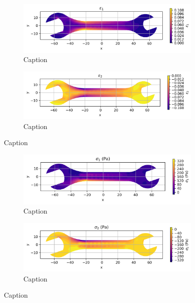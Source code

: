\documentclass{article}  %
\begin{document}
\begin{figure}[H]
  \centering
  \begin{subfigure}[t]{0.49\textwidth}
    \centering
    \includegraphics[width=\textwidth]{GRAFICOS/Case b - epsilon_1.png}
    \caption{Caption}
    \label{fig:deformada_reacciones}
  \end{subfigure}
  \hfill
  \begin{subfigure}[t]{0.49\textwidth}
    \centering
    \includegraphics[width=\textwidth]{GRAFICOS/Case b - epsilon_2.png}
    \caption{Caption}
    \label{fig:von_mises}
  \end{subfigure}
  \caption{Caption}
  \label{fig:analisis_estructural}
\end{figure}

\begin{figure}[H]
  \centering
  \begin{subfigure}[t]{0.49\textwidth}
    \centering
    \includegraphics[width=\textwidth]{GRAFICOS/Case b - sigma_1.png}
    \caption{Caption}
    \label{fig:deformada_reacciones}
  \end{subfigure}
  \hfill
  \begin{subfigure}[t]{0.49\textwidth}
    \centering
    \includegraphics[width=\textwidth]{GRAFICOS/Case b - sigma_2.png}
    \caption{Caption}
    \label{fig:von_mises}
  \end{subfigure}
  \caption{Caption}
  \label{fig:analisis_estructural}
\end{figure}
\end{document}
